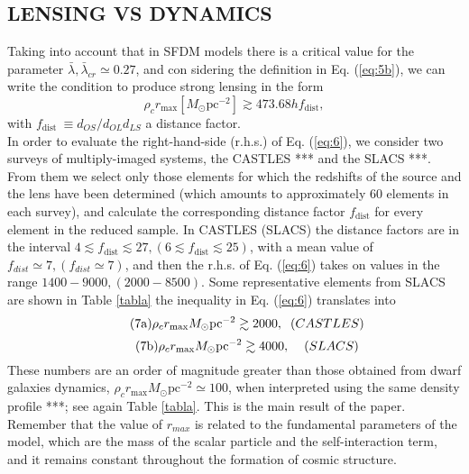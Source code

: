 \documentclass[10pt, letterpaper]{article}
\begin{document}
\begin{multicols}{2}
		\section{\centering\small\selectfont LENSING VS DYNAMICS}
		Taking into account that in SFDM models there is a critical value for the parameter  $\bar{\lambda},\bar{\lambda}_{cr}\simeq0.27$, and con sidering the definition in Eq. (\ref{eq:5b}), we can write the condition to produce strong lensing in the form
		\begin{equation}\tag{6}\label{eq:6}
			\rho_{c} r_{\max }\left[M_{\odot} \mathrm{pc}^{-2}\right] \gtrsim 473.68 h f_{\text {dist}},
		\end{equation}
		with $f_{\text {dist }}\equiv d_{OS}/d_{OL} d_{LS}$ a distance factor.\\
		In order to evaluate the right-hand-side (r.h.s.) of Eq. (\ref{eq:6}), we consider two surveys of multiply-imaged systems, the CASTLES *** and the SLACS ***. From them we select only those elements for which the redshifts of the source and the lens have been determined (which amounts to approximately 60 elements in each survey), and calculate the corresponding distance factor $f_{\text {dist}}$ for every element in the reduced sample. In CASTLES (SLACS) the distance factors are in the interval $4 \lesssim f_{\text {dist}} \lesssim 27, (6 \lesssim f_{\text {dist}} \lesssim 25)$, with a mean value of $f_{dist} \simeq 7, (f_{dist} \simeq 7)$, and then the r.h.s. of Eq. (\ref{eq:6}) takes on values in the range $1400 - 9000, (2000 - 8500)$.
		Some representative elements from SLACS are shown in Table \ref{tabla} the inequality in Eq. (\ref{eq:6}) translates into
		\begin{equation}\tag{7a}\label{eq:7a}
			\rho_{c} r_{\max } M_{\odot} \mathrm{pc}^{-2} \gtrsim 2000, \hspace{0.2cm} (CASTLES)
		\end{equation}
		\begin{equation}\tag{7b}\label{eq:7b}
			\rho_{c} r_{\max } M_{\odot} \mathrm{pc}^{-2} \gtrsim 4000, \hspace{0.4cm} (SLACS)
		\end{equation}
		These numbers are an order of magnitude greater than those obtained from dwarf galaxies dynamics, $\rho_c r_{\max}M_{\odot} \mathrm{pc}^{-2} \simeq 100$, when interpreted using the same density profile ***; see again Table \ref{tabla}. This is the main result of the paper. Remember that the value of $r_{max}$ is related to the fundamental parameters of the model, which are the mass of the scalar particle and the self-interaction term, and it remains constant throughout the formation of cosmic structure.\\

\end{multicols}
\end{document}
